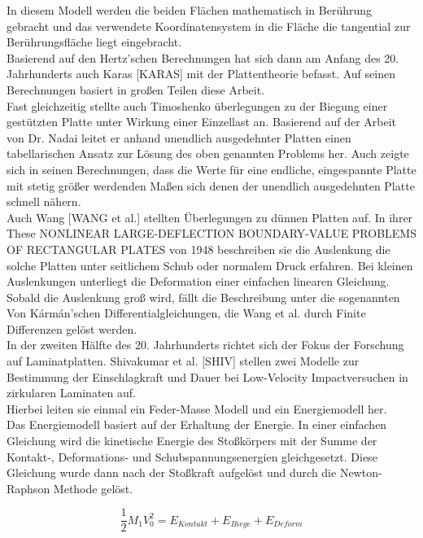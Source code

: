 In diesem Modell werden die beiden Flächen mathematisch in Berührung gebracht und das verwendete Koordinatensystem in die Fläche die tangential zur Berührungsfläche liegt eingebracht. \\


Basierend auf den Hertz'schen Berechnungen hat sich dann am Anfang des 20. Jahrhunderts auch Karas [KARAS] mit der Plattentheorie befasst. Auf seinen Berechnungen basiert in großen Teilen diese Arbeit. \\
Fast gleichzeitig stellte auch Timoshenko überlegungen zu der Biegung einer gestützten Platte unter Wirkung einer Einzellast an. Basierend auf der Arbeit von Dr. Nadai leitet er anhand unendlich ausgedehnter Platten einen tabellarischen Ansatz zur Lösung des oben genannten Problems her. Auch zeigte sich in seinen Berechnungen, dass die Werte für eine endliche, eingespannte Platte mit stetig größer werdenden Maßen sich denen der unendlich ausgedehnten Platte schnell nähern.\\
Auch Wang [WANG et al.] stellten Überlegungen zu dünnen Platten auf. In ihrer These NONLINEAR LARGE-DEFLECTION BOUNDARY-VALUE PROBLEMS OF RECTANGULAR PLATES von 1948 beschreiben sie die Auslenkung die solche Platten unter seitlichem Schub oder normalem Druck erfahren. Bei kleinen Auslenkungen unterliegt die Deformation einer einfachen linearen Gleichung. Sobald die Auslenkung groß wird, fällt die Beschreibung unter die sogenannten Von Kármán'schen Differentialgleichungen, die Wang et al. durch Finite Differenzen gelöst werden.\\
In der zweiten Hälfte des 20. Jahrhunderts richtet sich der Fokus der Forschung auf Laminatplatten. Shivakumar et al. [SHIV] stellen zwei Modelle zur Bestimmung der Einschlagkraft und Dauer bei Low-Velocity Impactversuchen in zirkularen Laminaten auf. \\
Hierbei leiten sie einmal ein Feder-Masse Modell und ein Energiemodell her. \\
Das Energiemodell basiert auf der Erhaltung der Energie. In einer einfachen Gleichung wird die kinetische Energie des Stoßkörpers mit der Summe der Kontakt-, Deformations- und Schubspannungsenergien gleichgesetzt. Diese Gleichung wurde dann nach der Stoßkraft aufgelöst und durch die Newton-Raphson Methode gelöst.

\begin{equation}
	\frac{1}{2} M_{1} V_{0}^{2} = E_{Kontakt} + E_{Biege} + E_{Deform}
\end{equation}

